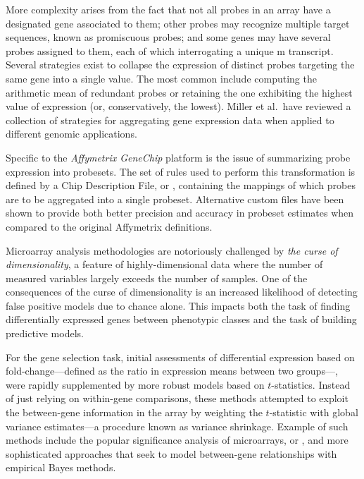 More complexity arises from the fact that not all probes in an array have a
designated gene associated to them; other probes may recognize multiple target
sequences, known as promiscuous probes; and some genes may have several probes
assigned to them, each of which interrogating a unique m
transcript.  Several strategies exist to collapse the expression of distinct
probes targeting the same gene into a single value.  The most common include
computing the arithmetic mean of redundant probes or retaining the one
exhibiting the highest value of expression (or, conservatively, the lowest).
Miller et al.~have reviewed a collection of strategies for aggregating gene
expression data when applied to different genomic
applications.\cite{miller_strategies_2011}

Specific to the \emph{Affymetrix GeneChip} platform is the issue of summarizing
probe expression into probesets.  The set of rules used to perform this
transformation is defined by a Chip Description File, or ,
containing the mappings of which probes are to be aggregated into a single
probeset.  Alternative custom  files have been shown to provide
both better precision and accuracy in probeset estimates when compared to the
original Affymetrix
definitions.\cite{gautier_alternative_2004,carter_redefinition_2005,dai_evolving_2005,sandberg_improved_2007,upton_causes_2009}

Microarray analysis methodologies are notoriously challenged by \emph{the curse
  of dimensionality},\cite{bellman_adaptive_1961} a feature of
highly-dimensional data where the number of measured variables largely exceeds
the number of samples.  One of the consequences of the curse of dimensionality
is an increased likelihood of detecting false positive models due to chance
alone.  This impacts both the task of finding differentially expressed genes
between phenotypic classes and the task of building predictive models.

For the gene selection task, initial assessments of differential expression
based on fold-change---defined as the ratio in expression means between two
groups---, were rapidly supplemented by more robust models based on
\mbox{$t$-statistics}.  Instead of just relying on within-gene comparisons,
these methods attempted to exploit the between-gene information in the array by
weighting the $t$-statistic with global variance estimates---a procedure known
as variance shrinkage.  Example of such methods include the popular significance
analysis of microarrays, or ,\cite{tusher_significance_2001} and
more sophisticated approaches that seek to model between-gene relationships with
empirical Bayes methods.\cite{newton_differential_2001}

